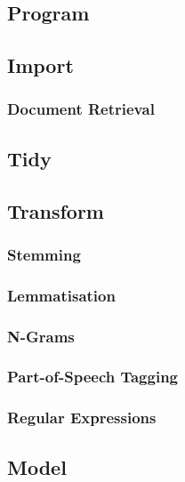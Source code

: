 \documentclass[]{book}
\theoremstyle{definition}
\theoremstyle{definition}
\theoremstyle{definition}
\theoremstyle{remark}
\begin{document}
\subsection{Program}\label{sotatoolsprogram}

\subsection{Import}\label{sotatoolsimport}

\subsubsection{Document Retrieval}\label{sotatoolsimportretrieval}

\subsection{Tidy}\label{sotatoolstidy}

\subsection{Transform}\label{sotatoolstransform}

\subsubsection{Stemming}\label{sotatoolstransformstemming}

\subsubsection{Lemmatisation}\label{sotatoolstransformlemmatisation}

\subsubsection{N-Grams}\label{sotatoolstransformngrams}

\subsubsection{Part-of-Speech Tagging}\label{sotatoolstransformpos}

\subsubsection{Regular Expressions}\label{sotatoolstransformregex}

\subsection{Model}\label{sotatoolsmodel}
\end{document}

